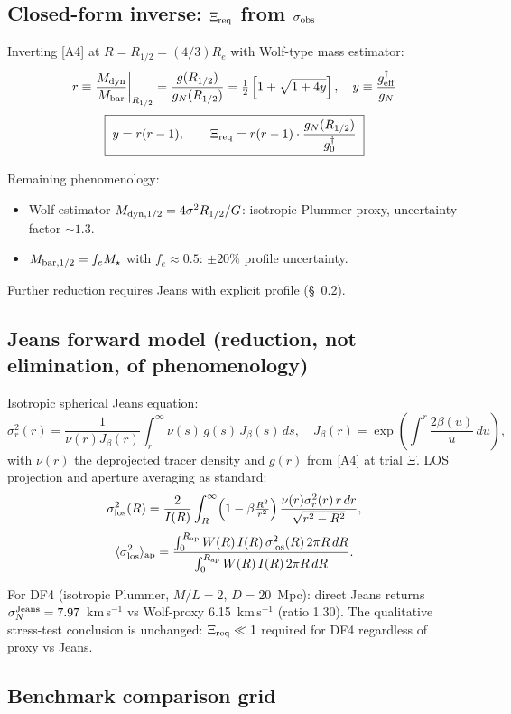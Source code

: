 \documentclass[11pt]{article}
\begin{document}
\subsection{Closed-form inverse: $\Xi_{\rm req}$ from $\sigma_{\rm obs}$}

Inverting [A4] at $R=R_{1/2}=(4/3)R_e$ with Wolf-type mass estimator:
$$
r \equiv \frac{M_{\rm dyn}}{M_{\rm bar}}\bigg|_{R_{1/2}}
= \frac{g(R_{1/2})}{g_N(R_{1/2})}
= \tfrac{1}{2}\left[1+\sqrt{1+4y}\right], \quad y\equiv\frac{g^\dagger_{\rm eff}}{g_N}
$$
$$
\boxed{\;y = r(r-1), \qquad \Xi_{\rm req} = r(r-1)\cdot\frac{g_N(R_{1/2})}{g^\dagger_0}\;}
$$

Remaining phenomenology:
\begin{itemize}
\item[{[PHEN-1]}] Wolf estimator $M_{\rm dyn,1/2} = 4\sigma^2 R_{1/2}/G$:
isotropic-Plummer proxy, uncertainty factor $\sim 1.3$.
\item[{[PHEN-2]}] $M_{\rm bar,1/2}=f_e M_\star$ with $f_e\approx 0.5$:
$\pm 20\%$ profile uncertainty.
\end{itemize}
Further reduction requires Jeans with explicit profile (\S~\ref{sec:jeans}).

\subsection{Jeans forward model (reduction, not elimination, of phenomenology)}
\label{sec:jeans}

Isotropic spherical Jeans equation:
$$
\sigma_r^2(r) = \frac{1}{\nu(r)J_\beta(r)}\int_r^\infty \nu(s)\,g(s)\,J_\beta(s)\,ds,
\quad
J_\beta(r) = \exp\!\left(\int^r\!\!\frac{2\beta(u)}{u}\,du\right),
$$
with $\nu(r)$ the deprojected tracer density and $g(r)$ from [A4] at
trial $\Xi$. LOS projection and aperture averaging as standard:
$$
\sigma_{\rm los}^2(R)=\frac{2}{I(R)}\int_R^\infty\!
\left(1-\beta\tfrac{R^2}{r^2}\right)\frac{\nu(r)\sigma_r^2(r)\,r\,dr}{\sqrt{r^2-R^2}},
$$
$$
\langle\sigma_{\rm los}^2\rangle_{\rm ap}
= \frac{\int_0^{R_{\rm ap}}W(R)\,I(R)\,\sigma_{\rm los}^2(R)\,2\pi R\,dR}
{\int_0^{R_{\rm ap}}W(R)\,I(R)\,2\pi R\,dR}.
$$

For DF4 (isotropic Plummer, $M/L=2$, $D=20$~Mpc): direct Jeans returns
$\sigma_N^{\rm Jeans}=7.97$~km\,s$^{-1}$ vs Wolf-proxy 6.15~km\,s$^{-1}$
(ratio 1.30). The qualitative stress-test conclusion is unchanged:
$\Xi_{\rm req}\ll 1$ required for DF4 regardless of proxy vs Jeans.

\subsection{Benchmark comparison grid}
\end{document}
